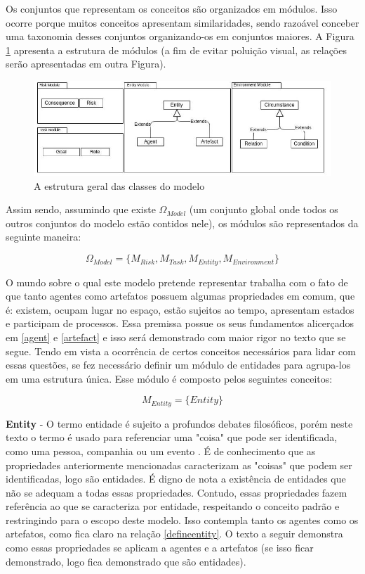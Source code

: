 Os conjuntos que representam os conceitos são organizados em  módulos. Isso ocorre porque muitos conceitos apresentam similaridades, sendo razoável conceber uma taxonomia desses conjuntos organizando-os em conjuntos maiores. A Figura \ref{module} apresenta a estrutura de módulos (a fim de evitar poluição visual, as relações serão apresentadas em outra Figura). 

\begin{figure}[H]
  \centering
  \includegraphics[width=1\linewidth]{figure/Module.jpeg} 
  \caption{A estrutura geral das classes do modelo}
  \label{module}
\end{figure}

Assim sendo, assumindo que existe $\Omega_{Model}$ (um conjunto global onde todos os outros conjuntos do modelo estão contidos nele), os módulos são representados da seguinte maneira: 

\begin{equation} 
    \Omega_{Model} = \{ M_{Risk}, M_{Task}, M_{Entity}, M_{Environment}\}
\end{equation}
\label{modules}


O mundo sobre o qual este modelo pretende representar trabalha com o fato de que tanto agentes como artefatos possuem algumas propriedades em comum, que é: existem, ocupam lugar no espaço, estão sujeitos ao tempo, apresentam estados e participam de processos. Essa premissa possue os seus fundamentos alicerçados em \ref{agent} e \ref{artefact} e isso será demonstrado com maior rigor no texto que se segue. Tendo em vista a ocorrência de certos conceitos necessários para lidar com essas questões, se fez necessário definir um módulo de entidades para agrupa-los em uma estrutura única. Esse módulo é composto pelos seguintes conceitos:

\begin{equation} 
M_{Entity} = \{ Entity \}
\end{equation}\label{modent}

\textbf{Entity} - O termo entidade é sujeito a profundos debates filosóficos, porém neste texto o termo é usado para referenciar uma "coisa" que pode ser identificada, como uma pessoa, companhia ou um evento \cite{entity}. É de conhecimento que as propriedades anteriormente mencionadas caracterizam as "coisas" que podem ser identificadas, logo são entidades. É digno de nota a existência de entidades que não se adequam a todas essas propriedades. Contudo, essas propriedades fazem referência ao que se caracteriza por entidade, respeitando o conceito padrão \cite{entity} e restringindo para o escopo deste modelo. Isso contempla tanto os agentes como os artefatos, como fica claro na relação \ref{defineentity}. O texto a seguir demonstra como essas propriedades se aplicam a agentes e a artefatos (se isso ficar demonstrado, logo fica demonstrado que são entidades).

